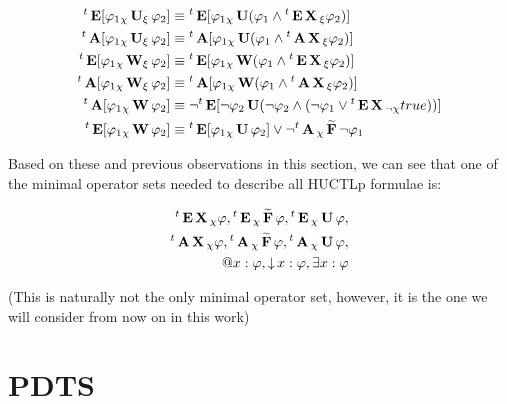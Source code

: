 \begin{align*}
	\withTime{t} \ctlE[\varphi_1 \dctlUlr{\chi}{\xi} \varphi_2]						& \equiv \withTime{t} \ctlE[\varphi_1 \dctlUl{\chi} (\varphi_1 \land \withTime{t}\ctlE\dctlX{\xi} \varphi_2)] \\
	\withTime{t} \ctlA[\varphi_1 \dctlUlr{\chi}{\xi} \varphi_2]						& \equiv \withTime{t} \ctlA[\varphi_1 \dctlUl{\chi} (\varphi_1 \land \withTime{t}\ctlA\dctlX{\xi} \varphi_2)] \\
	\withTime{t} \ctlE[\varphi_1 \dctlWlr{\chi}{\xi} \varphi_2]						& \equiv \withTime{t} \ctlE[\varphi_1 \dctlWl{\chi} (\varphi_1 \land \withTime{t}\ctlE\dctlX{\xi} \varphi_2)] \\
	\withTime{t} \ctlA[\varphi_1 \dctlWlr{\chi}{\xi} \varphi_2]						& \equiv \withTime{t} \ctlA[\varphi_1 \dctlWl{\chi} (\varphi_1 \land \withTime{t}\ctlA\dctlX{\xi} \varphi_2)] \\
	\withTime{t}\ctlA[\varphi_1 \dctlWl{\chi} \varphi_2] 				  & \equiv \neg \withTime{t}\ctlE[ \neg \varphi_2 \ctlU (\neg \varphi_2 \land (\neg \varphi_1 \lor \withTime{t}\ctlE \dctlX{\neg\chi} true)) ] \\
	\withTime{t}\ctlE[\varphi_1 \dctlWl{\chi} \varphi_2] 				  & \equiv \withTime{t}\ctlE[\varphi_1 \dctlUl{\chi} \varphi_2] \lor \neg \withTime{t}\ctlA \dctlFW{\chi} \neg \varphi_1 \\
\end{align*}

Based on these and previous observations in this section, we can see that one of the minimal operator sets needed to describe all \ac{HUCTLp} formulae is:

\begin{align*}
	\withTime{t}\ctlE\dctlX{\chi} \varphi, \withTime{t}\ctlE\dctlFW{\chi} \varphi, \withTime{t}\ctlE\dctlUl{\chi} \varphi, \\
	\withTime{t}\ctlA\dctlX{\chi} \varphi, \withTime{t}\ctlA\dctlFW{\chi} \varphi, \withTime{t}\ctlA\dctlUl{\chi} \varphi, \\
	\hctlAt{x} \varphi, \hctlBind{x} \varphi, \hctlExists{x} \varphi
\end{align*}

(This is naturally not the only minimal operator set, however, it is the one we will consider from now on in this work)

\section{\Acl{PDTS}}

